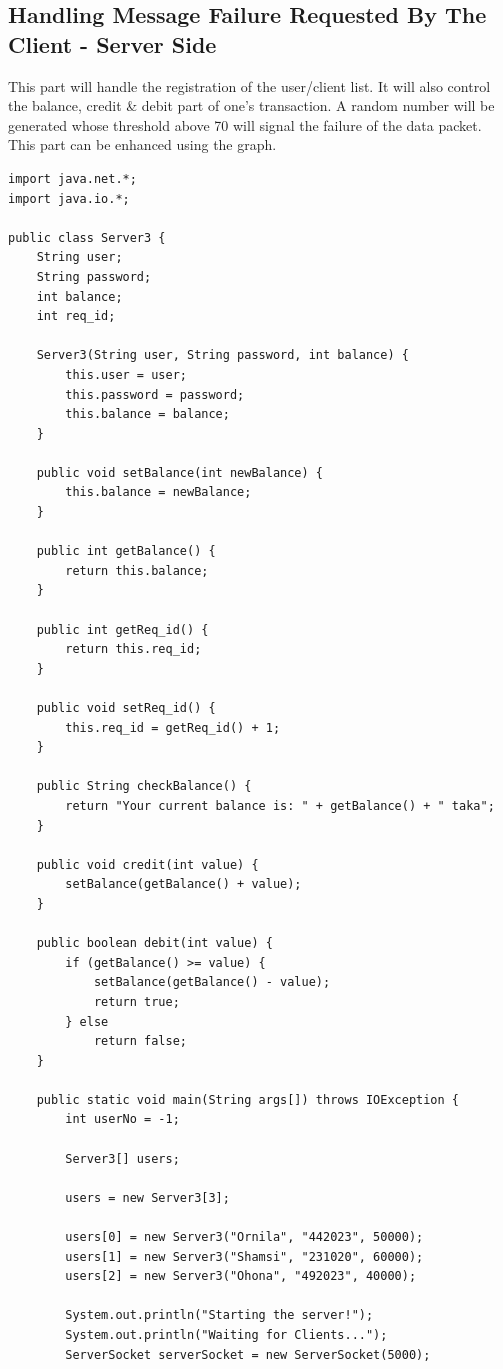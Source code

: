 \documentclass[11pt]{article}
\begin{document}
\subsection{Handling Message Failure  Requested By The Client - Server Side }
This part will handle the registration of the user/client list. It will also control the balance, credit & debit part of one's transaction. A random number will be generated whose threshold above 70 will signal the failure of the data packet. This part can be enhanced using the graph. 
\
\begin{verbatim}
import java.net.*;
import java.io.*;

public class Server3 {
    String user;
    String password;
    int balance;
    int req_id;

    Server3(String user, String password, int balance) {
        this.user = user;
        this.password = password;
        this.balance = balance;
    }

    public void setBalance(int newBalance) {
        this.balance = newBalance;
    }

    public int getBalance() {
        return this.balance;
    }

    public int getReq_id() {
        return this.req_id;
    }

    public void setReq_id() {
        this.req_id = getReq_id() + 1;
    }

    public String checkBalance() {
        return "Your current balance is: " + getBalance() + " taka";
    }

    public void credit(int value) {
        setBalance(getBalance() + value);
    }

    public boolean debit(int value) {
        if (getBalance() >= value) {
            setBalance(getBalance() - value);
            return true;
        } else
            return false;
    }

    public static void main(String args[]) throws IOException {
        int userNo = -1;

        Server3[] users;

        users = new Server3[3];

        users[0] = new Server3("Ornila", "442023", 50000);
        users[1] = new Server3("Shamsi", "231020", 60000);
        users[2] = new Server3("Ohona", "492023", 40000);

        System.out.println("Starting the server!");
        System.out.println("Waiting for Clients...");
        ServerSocket serverSocket = new ServerSocket(5000);


\end{verbatim}
\end{document}

